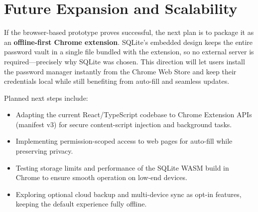 \section{Future Expansion and Scalability}
If the browser-based prototype proves successful, the next plan is to
package it as an \textbf{offline-first Chrome extension}.  
SQLite's embedded design keeps the entire password vault in a single file
bundled with the extension, so no external server is required—precisely why
SQLite was chosen.  This direction will let users install the password manager
instantly from the Chrome Web Store and keep their credentials local while
still benefiting from auto-fill and seamless updates.

Planned next steps include:
\begin{itemize}
  \item Adapting the current React/TypeScript codebase to Chrome Extension
        APIs (manifest v3) for secure content-script injection and
        background tasks.
  \item Implementing permission-scoped access to web pages for auto-fill
        while preserving privacy.
  \item Testing storage limits and performance of the SQLite WASM build in
        Chrome to ensure smooth operation on low-end devices.
  \item Exploring optional cloud backup and multi-device sync as opt-in
        features, keeping the default experience fully offline.
\end{itemize}




